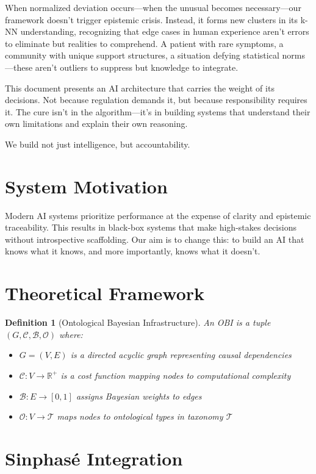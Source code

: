 \documentclass{article}
\newtheorem{definition}[theorem]{Definition}
\begin{document}
When normalized deviation occurs—when the unusual becomes necessary—our framework doesn't trigger epistemic crisis. Instead, it forms new clusters in its k-NN understanding, recognizing that edge cases in human experience aren't errors to eliminate but realities to comprehend. A patient with rare symptoms, a community with unique support structures, a situation defying statistical norms—these aren't outliers to suppress but knowledge to integrate.

This document presents an AI architecture that carries the weight of its decisions. Not because regulation demands it, but because responsibility requires it. The cure isn't in the algorithm—it's in building systems that understand their own limitations and explain their own reasoning.

We build not just intelligence, but accountability.

\section{System Motivation}
Modern AI systems prioritize performance at the expense of clarity and epistemic traceability. This results in black-box systems that make high-stakes decisions without introspective scaffolding. Our aim is to change this: to build an AI that knows what it knows, and more importantly, knows what it doesn't.

\section{Theoretical Framework}

\begin{definition}[Ontological Bayesian Infrastructure]
An OBI is a tuple $(G, \mathcal{C}, \mathcal{B}, \mathcal{O})$ where:
\begin{itemize}
\item $G = (V, E)$ is a directed acyclic graph representing causal dependencies
\item $\mathcal{C}: V \rightarrow \mathbb{R}^+$ is a cost function mapping nodes to computational complexity
\item $\mathcal{B}: E \rightarrow [0,1]$ assigns Bayesian weights to edges
\item $\mathcal{O}: V \rightarrow \mathcal{T}$ maps nodes to ontological types in taxonomy $\mathcal{T}$
\end{itemize}
\end{definition}

\section{Sinphasé Integration}
\end{document}
